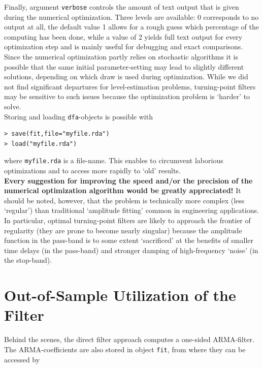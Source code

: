 \documentclass[a4paper]{article}
\begin{document}
Finally, argument \texttt{verbose} controls the amount of text output
that is given during the numerical optimization. Three levels are
available: 0 corresponds to no output at all, the default value 1
allows for a rough guess which percentage of the computing has been
done, while a value of 2 yields full text output for every
optimization step and is mainly useful for debugging and exact
comparisons.\\

Since the numerical optimization partly relies on stochastic
algorithms it is possible that the same initial parameter-setting may
lead to slightly different solutions, depending on which draw is used
during optimization. While we did not find significant departures for
level-estimation problems, turning-point filters may be sensitive to
such issues because the optimization problem is `harder' to solve.\\


Storing and loading \texttt{dfa}-objects is possible with
\begin{verbatim}
> save(fit,file="myfile.rda")
> load("myfile.rda")
\end{verbatim}
where \texttt{myfile.rda} is a file-name. This enables to circumvent
laborious optimizations and to access more rapidly to `old' results.\\


\noindent \textbf{Every suggestion for improving the speed and/or the
  precision of the numerical optimization algorithm would be greatly
  appreciated!} It should be noted, however, that the problem is
technically more complex (less `regular') than traditional `amplitude
fitting' common in engineering applications. In particular, optimal
turning-point filters are likely to approach the frontier of
regularity (they are prone to become nearly singular) because the
amplitude function in the pass-band is to some extent `sacrificed' at
the benefits of smaller time delays (in the pass-band) and stronger
damping of high-frequency `noise' (in the stop-band). 




\section{Out-of-Sample Utilization of the Filter}

Behind the scenes, the direct filter approach computes a one-sided
ARMA-filter. The ARMA-coefficients are also stored in object
\texttt{fit}, from where they can be accessed by
\end{document}

